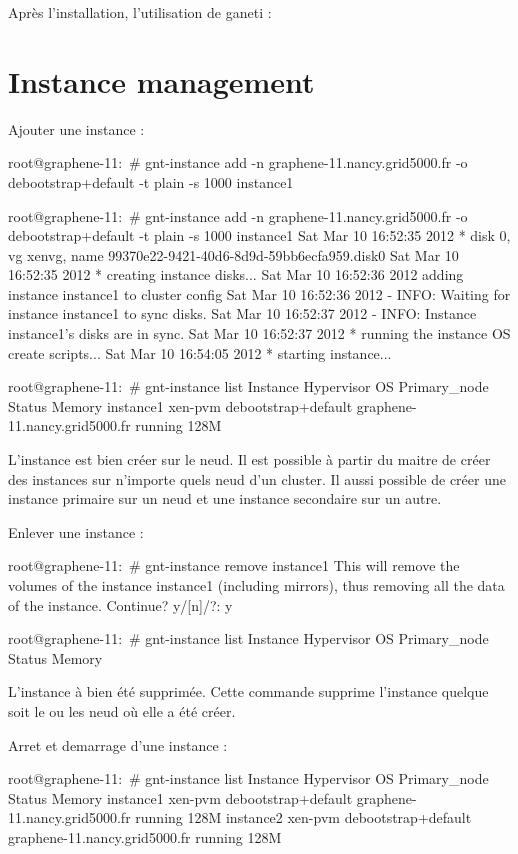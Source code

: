
Après l'installation, l'utilisation de ganeti :

\section {Instance management}

Ajouter une instance :

root@graphene-11:~# gnt-instance add -n graphene-11.nancy.grid5000.fr -o debootstrap+default -t plain -s 1000 instance1

root@graphene-11:~# gnt-instance add -n graphene-11.nancy.grid5000.fr -o debootstrap+default -t plain -s 1000 instance1
Sat Mar 10 16:52:35 2012 * disk 0, vg xenvg, name 99370e22-9421-40d6-8d9d-59bb6ecfa959.disk0
Sat Mar 10 16:52:35 2012 * creating instance disks...
Sat Mar 10 16:52:36 2012 adding instance instance1 to cluster config
Sat Mar 10 16:52:36 2012  - INFO: Waiting for instance instance1 to sync disks.
Sat Mar 10 16:52:37 2012  - INFO: Instance instance1's disks are in sync.
Sat Mar 10 16:52:37 2012 * running the instance OS create scripts...
Sat Mar 10 16:54:05 2012 * starting instance...

root@graphene-11:~# gnt-instance list
Instance  Hypervisor OS                  Primary_node                  Status  Memory
instance1 xen-pvm    debootstrap+default graphene-11.nancy.grid5000.fr running   128M

L'instance est bien créer sur le neud. Il est possible à partir du maitre de créer des instances sur n'importe quels neud d'un cluster. Il aussi possible de créer une instance primaire sur un neud et une instance secondaire sur un autre.

Enlever une instance :

root@graphene-11:~# gnt-instance remove instance1
This will remove the volumes of the instance instance1 (including
mirrors), thus removing all the data of the instance. Continue?
y/[n]/?: y

root@graphene-11:~# gnt-instance list
Instance Hypervisor OS Primary_node Status Memory

L'instance à bien été supprimée. Cette commande supprime l'instance quelque soit le ou les neud où elle a été créer.


Arret et demarrage d'une instance :

root@graphene-11:~# gnt-instance list
Instance  Hypervisor OS                  Primary_node                  Status  Memory
instance1 xen-pvm    debootstrap+default graphene-11.nancy.grid5000.fr running   128M
instance2 xen-pvm    debootstrap+default graphene-11.nancy.grid5000.fr running   128M

